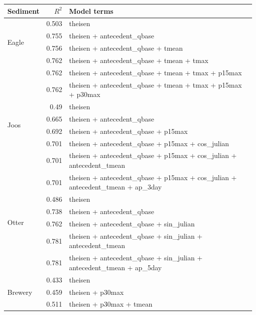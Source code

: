 \documentclass[12pt]{article}
\begin{document}
\begin{table}[h] \small
    \begin{center}
    \begin{tabular}{lrl}
    \textbf{Sediment} & $R^2$ & Model terms \\
    \hline
    \multirow{4}{*}{Eagle} & 0.503 & theisen\\
    & 0.755 & theisen + antecedent\_qbase\\
    & 0.756 & theisen + antecedent\_qbase + tmean\\
    & 0.762 & theisen + antecedent\_qbase + tmean + tmax \\
    & 0.762 & theisen + antecedent\_qbase + tmean + tmax + p15max \\
    & 0.762 & theisen + antecedent\_qbase + tmean + tmax + p15max + p30max
    \vspace{2mm}\\
    \multirow{4}{*}{Joos} & 0.49 & theisen\\
    & 0.665 & theisen + antecedent\_qbase\\
    & 0.692 & theisen + antecedent\_qbase + p15max\\
    & 0.701 & theisen + antecedent\_qbase + p15max + cos\_julian \\
    & 0.701 & theisen + antecedent\_qbase + p15max + cos\_julian + antecedent\_tmean\\
    & 0.701 & theisen + antecedent\_qbase + p15max + cos\_julian + antecedent\_tmean + ap\_3day
    \vspace{2mm}\\
    \multirow{4}{*}{Otter} & 0.486 & theisen\\
    & 0.738 & theisen + antecedent\_qbase\\
    & 0.762 & theisen + antecedent\_qbase + sin\_julian\\
    & 0.781 & theisen + antecedent\_qbase + sin\_julian + antecedent\_tmean \\
    & 0.781 & theisen + antecedent\_qbase + sin\_julian + antecedent\_tmean + ap\_5day
    \vspace{2mm}\\
    \multirow{3}{*}{Brewery} & 0.433 & theisen\\
    & 0.459 & theisen + p30max\\
    & 0.511 & theisen + p30max + tmean
    \vspace{6mm}\\


\end{tabular}
\end{center}
\end{table}
\end{document}
